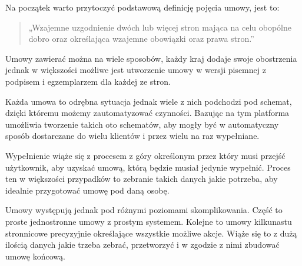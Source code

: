 Na początek warto przytoczyć podstawową definicję pojęcia umowy, jest to:

\begin{quote}
    „Wzajemne uzgodnienie dwóch lub więcej stron mająca na celu obopólne dobro oraz określająca wzajemne obowiązki oraz prawa stron.” \cite{enc-zarzadzania}
\end{quote}

Umowy zawierać można na wiele sposobów, każdy kraj dodaje swoje obostrzenia jednak w większości możliwe jest utworzenie umowy w wersji pisemnej z podpisem i egzemplarzem dla każdej ze stron.  

Każda umowa to odrębna sytuacja jednak wiele z nich podchodzi pod schemat, dzięki któremu możemy zautomatyzować czynności. Bazując na tym platforma umożliwia tworzenie takich oto schematów, aby mogły być w automatyczny sposób dostarczane do wielu klientów i przez wielu na raz wypełniane. 

Wypełnienie wiąże się z procesem z góry określonym przez który musi przejść użytkownik, aby uzyskać umową, którą będzie musiał jedynie wypełnić. Proces ten w większości przypadków to zebranie takich danych jakie potrzeba, aby idealnie przygotować umowę pod daną osobę. 

Umowy występują jednak pod różnymi poziomami skomplikowania. Część to proste jednostronne umowy z prostym systemem. Kolejne to umowy kilkunastu stronnicowe precyzyjnie określające wszystkie możliwe akcje. Wiąże się to z dużą ilością danych jakie trzeba zebrać, przetworzyć i w zgodzie z nimi zbudować umowę końcową.
